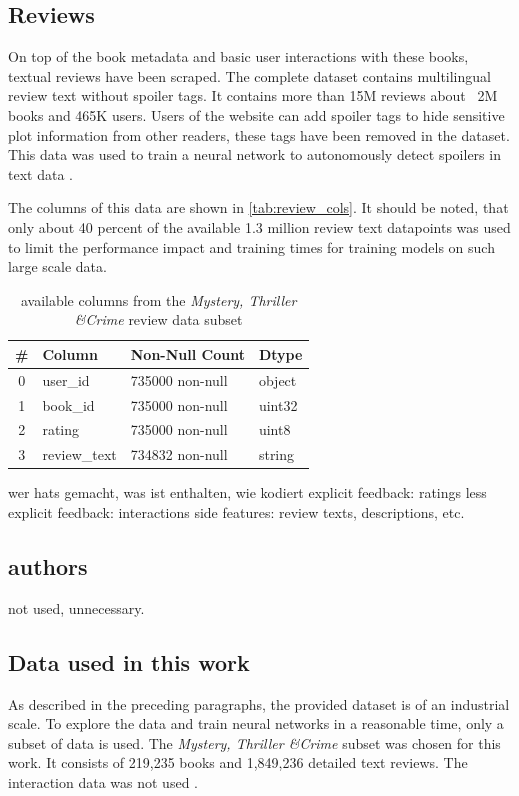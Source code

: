\documentclass[10pt,final,journal,a4paper,oneside,twocolumn]{IEEEtran}
\begin{document}
\subsection{Reviews}
On top of the book metadata and basic user interactions with these books, textual reviews have been scraped. The complete dataset contains multilingual review text without spoiler tags. It contains more than 15M reviews about ~2M books and 465K users. Users of the website can add spoiler tags to hide sensitive plot information from other readers, these tags have been removed in the dataset. This data was used to train a neural network to autonomously detect spoilers in text data \cite{Wan.2019}.

The columns of this data are shown in \autoref{tab:review_cols}. It should be noted, that only about 40 percent of the available 1.3 million review text datapoints was used to limit the performance impact and training times for training models on such large scale data.
\begin{table}[h]
\begin{center}
        \begin{tabular}{clll}
            \toprule
            \# & Column & Non-Null Count & Dtype \\
            \midrule
            0 & user\_id & 735000 non-null & object \\
            1 & book\_id & 735000 non-null & uint32 \\
            2 & rating & 735000 non-null & uint8 \\
            3 & review\_text & 734832 non-null & string \\
            \bottomrule
            \end{tabular}        
            \caption{available columns from the \emph{Mystery, Thriller \&Crime} review data subset}
            \label{tab:review_cols}
    
\end{center}\end{table}
% 

wer hats gemacht, was ist enthalten, wie kodiert
explicit feedback: ratings
less explicit feedback: interactions
side features: review texts, descriptions, etc.
\subsection{authors}
not used, unnecessary.

\subsection{Data used in this work}
As described in the preceding paragraphs, the provided dataset is of an industrial scale. To explore the data and train neural networks in a reasonable time, only a subset of data is used.
The \emph{Mystery, Thriller \&Crime} subset was chosen for this work. It consists of 219,235 books and 1,849,236 detailed text reviews. The interaction data was not used .
\end{document}
